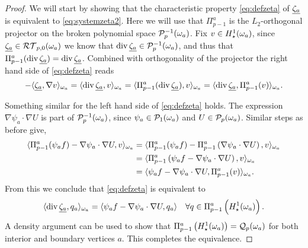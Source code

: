 \documentclass[thesis.tex]{subfiles}
\begin{document}
\begin{proof}
  We will start by showing that the characteristic property \eqref{eq:defzeta}  of $\underline{\zeta_a}$ is equivalent to \eqref{eq:systemzeta2}.
  Here we will use that $\Pi_{p-1}^a$ is the $L_2$-orthogonal projector on the broken polynomial space $\mathcal{P}_p^{-1}(\omega_a)$.  Fix $v \in H_\star^1(\omega_a)$, 
  since $\underline{\zeta_a} \in \mathcal{RT}_{p,0}(\omega_a)$ we know that $\operatorname{div} \underline{\zeta_a} \in \mathcal{P}_p^{-1}(\omega_a)$, and thus that $\Pi_{p-1}^a( \operatorname{div} \underline{\zeta_a} )= \operatorname{div} \underline{\zeta_a}$. Combined with orthogonality of the projector the right hand side of \eqref{eq:defzeta} reads
  \[
    -\langle \underline{\zeta_a}, \nabla v \rangle_{\omega_a} = \langle \operatorname{div} \underline{\zeta_a}, v \rangle_{\omega_a} = \langle  \Pi_{p-1}^a(\operatorname{div} \underline{\zeta_a}), v \rangle_{\omega_a} = \langle \operatorname{div} \underline{\zeta_a}, \Pi_{p-1}^a(v) \rangle_{\omega_a}.
  \]

  Something similar for the left hand side of \eqref{eq:defzeta} holds. The expression $\nabla \psi_a \cdot \nabla U$ is part of
  $\mathcal{P}_p^{-1}(\omega_a)$, since $\psi_a \in \mathcal{P}_1(\omega_a)$ and $U \in \mathcal{P}_{p}(\omega_a)$. Similar steps as before give, 
  \begin{align*}
    \langle \Pi_{p-1}^a(\psi_a f) - \nabla \psi_a \cdot \nabla U, v \rangle_{\omega_a} &= \langle \Pi_{p-1}^a(\psi_a f) - \Pi_{p-1}^a\left(\nabla \psi_a \cdot \nabla U\right),v \rangle_{\omega_a}\\
    &= \langle \Pi_{p-1}^a\left(\psi_a f - \nabla \psi_a \cdot \nabla U\right), v \rangle_{\omega_a}\\
    &= \langle \psi_a f - \nabla \psi_a \cdot \nabla U, \Pi_{p-1}^a(v) \rangle_{\omega_a}.
  \end{align*}
  From this we conclude that \eqref{eq:defzeta} is equivalent to
  \begin{equation}
    \label{eq:defzetanoproj}
    \langle \operatorname{div} \underline{\zeta_a}, q_a \rangle_{\omega_a} = \langle \psi_a f - \nabla \psi_a \cdot \nabla U, q_a \rangle \quad \forall q \in \Pi_{p-1}^a\left(H_\star^1(\omega_a)\right).
  \end{equation}
  A density argument can be used to show that $\Pi_{p-1}^a\left(H_\star^1(\omega_a)\right) = \mathcal{Q}_p(\omega_a)$ for both interior and boundary vertices $a$. 
  This completes the equivalence.



\end{proof}
\end{document}
